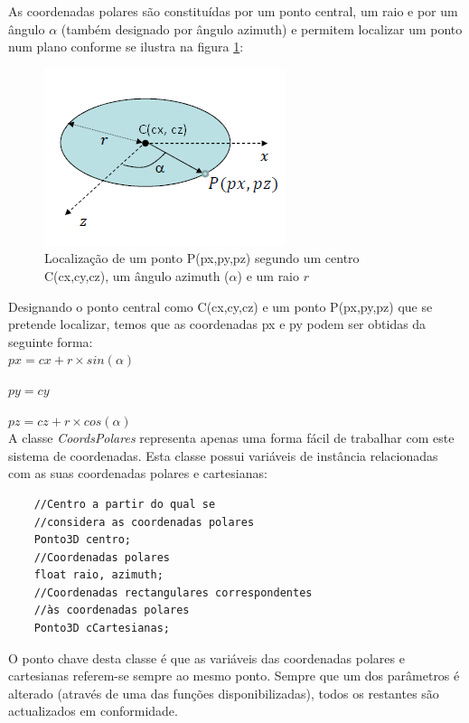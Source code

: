 As coordenadas polares são constituídas por um ponto central, um raio e por um ângulo $\alpha$ (também designado por ângulo azimuth) e permitem localizar um ponto num plano conforme se ilustra na figura \ref{p1:fig:p1_polarCoords}:

\begin{figure}[<+htpb+>]
	\centering
	\includegraphics[scale=1.0]{imagens/p1_polarCoords.png}
	\caption{Localização de um ponto P(px,py,pz) segundo um centro C(cx,cy,cz), um ângulo azimuth ($\alpha$) e um raio $r$}
	\label{p1:fig:p1_polarCoords}
\end{figure}

Designando o ponto central como C(cx,cy,cz) e um ponto P(px,py,pz) que se pretende localizar, temos que as coordenadas px e py podem ser obtidas da seguinte forma:\\

	$px = cx + r \times sin(\alpha)$
	
	$py = cy$
	
	$pz = cz + r \times cos(\alpha)$\\

A classe \textit{CoordsPolares} representa apenas uma forma fácil de trabalhar com este sistema de coordenadas. Esta classe possui variáveis de instância relacionadas com as suas coordenadas polares e cartesianas:

\begin{Verbatim}
	//Centro a partir do qual se 
	//considera as coordenadas polares
	Ponto3D centro;
	//Coordenadas polares
	float raio, azimuth;
	//Coordenadas rectangulares correspondentes 
	//às coordenadas polares
	Ponto3D cCartesianas;
\end{Verbatim}

O ponto chave desta classe é que as variáveis das coordenadas polares e cartesianas referem-se sempre ao mesmo ponto. Sempre que um dos parâmetros é alterado (através de uma das funções disponibilizadas), todos os restantes são actualizados em conformidade.

